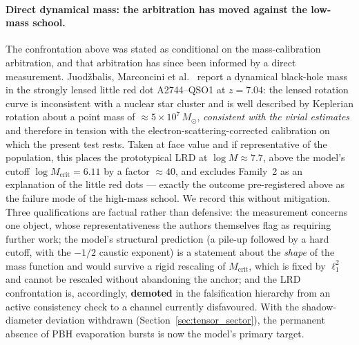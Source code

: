 \documentclass[11pt,a4paper]{article}
\theoremstyle{plain}
\theoremstyle{remark}
\begin{document}
\paragraph{Direct dynamical mass: the arbitration has moved against the low-mass school.} The confrontation above was stated as conditional on the mass-calibration arbitration, and that arbitration has since been informed by a direct measurement. Juod\v{z}balis, Marconcini et al.~\cite{juodzbalis2026} report a dynamical black-hole mass in the strongly lensed little red dot A2744--QSO1 at $z = 7.04$: the lensed rotation curve is inconsistent with a nuclear star cluster and is well described by Keplerian rotation about a point mass of $\approx 5\times10^{7}\,M_\odot$, \emph{consistent with the virial estimates} and therefore in tension with the electron-scattering-corrected calibration on which the present test rests. Taken at face value and if representative of the population, this places the prototypical LRD at $\log M \approx 7.7$, above the model's cutoff $\log M_{\text{crit}} = 6.11$ by a factor $\approx 40$, and excludes Family~2 as an explanation of the little red dots --- exactly the outcome pre-registered above as the failure mode of the high-mass school. We record this without mitigation. Three qualifications are factual rather than defensive: the measurement concerns one object, whose representativeness the authors themselves flag as requiring further work; the model's structural prediction (a pile-up followed by a hard cutoff, with the $-1/2$ caustic exponent) is a statement about the \emph{shape} of the mass function and would survive a rigid rescaling of $M_{\text{crit}}$, which is fixed by $\ell_1^2$ and cannot be rescaled without abandoning the anchor; and the LRD confrontation is, accordingly, \textbf{demoted} in the falsification hierarchy from an active consistency check to a channel currently disfavoured. With the shadow-diameter deviation withdrawn (Section~\ref{sec:tensor_sector}), the permanent absence of PBH evaporation bursts is now the model's primary target.
\end{document}
